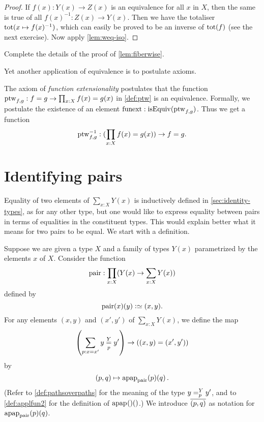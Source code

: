 \begin{proof}
If $f(x): Y(x) \to Z(x)$ is an equivalence for all $x$ in $X$,
then the same is true of all $f(x)^{-1}: Z(x) \to Y(x)$.
Then we have the totaliser $\tot(x\mapsto f(x)^{-1})$,
which can easily be proved to be an inverse of $\tot(f)$
(see the next exercise). Now apply \cref{lem:weq-iso}.
\end{proof}

\begin{xca}\label{xca:fiberwise}
Complete the details of the proof of \cref{lem:fiberwise}.
\end{xca}

Yet another application of  equivalence is to postulate axioms.

\begin{definition}\label{def:funext}
The axiom of \emph{function extensionality} postulates that the function
$\ptw_{f,g}: f=g \to \prod_{x:X} f(x)=g(x)$ in \cref{def:ptw} is an equivalence.
Formally, we postulate the existence of an element $\funext : \isEq(\ptw_{f,g})$.
Thus we get a function 
\[{\ptw}^{-1}_{f,g}: (\prod_{x:X} f(x)=g(x)) \to f=g.\]
\end{definition}


\section{Identifying pairs}\label{sec:pairpaths}

Equality of two elements of $\sum _{x:X} Y(x)$ is inductively defined in \cref{sec:identity-types}, as for any other type, but
one would like to express equality between pairs in terms of equalities in the constituent types.  This would explain better what it means for
two pairs to be equal.  We start with a definition.

\begin{definition}\label{def:pairtopath}
  Suppose we are given a type $X$ and a family of types $Y(x)$ parametrized by the elements $x$ of $X$.
  Consider the function $$\pair : \prod_{x:X} ( Y(x) \to \sum _{x:X} Y(x) ) $$ defined by $$ \pair(x)(y) \defeq (x,y). $$
  For any elements $(x,y)$ and $(x',y')$ of $\sum _{x:X} Y(x)$, we define the map 
  $$\left( \sum_{p:x=x'} {y} \overset{Y}{\underset{p}=} y' \right) \to \left ( (x,y) = (x',y') \right )$$
  by $$ (p,q) \mapsto \apap {\pair} p q. $$
  (Refer to \cref{def:pathsoverpaths} for the meaning of the type $y =^{Y}_{p} y'$, and to \cref{def:applfun2} for the definition of $\apap{}{}{}$.)
  We introduce $\overline{({p},{q})}$ as notation for $\apap {\pair} p q$.
\end{definition}

